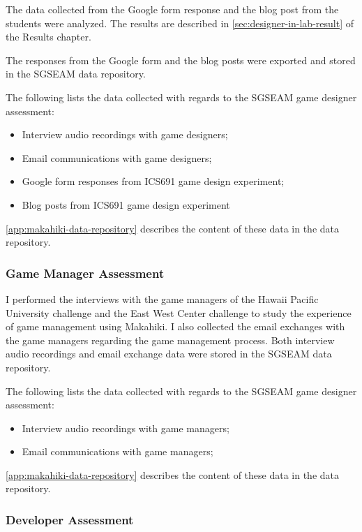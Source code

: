 The data collected from the Google form response and the blog post from the students were analyzed. The results are described in \autoref{sec:designer-in-lab-result} of the Results chapter.

The responses from the Google form and the blog posts were exported and stored in the SGSEAM data repository.

The following lists the data collected with regards to the SGSEAM game designer assessment:

\begin{itemize}
\item Interview audio recordings with game designers;
\item Email communications with game designers;
\item Google form responses from ICS691 game design experiment; 
\item Blog posts from ICS691 game design experiment
\end{itemize}

\autoref{app:makahiki-data-repository} describes the content of these data in the data repository.

\subsubsection{Game Manager Assessment}

I performed the interviews with the game managers of the Hawaii Pacific University challenge and the East West Center challenge to study the experience of game management using Makahiki. I also collected the email exchanges with the game managers regarding the game management process. Both interview audio recordings and email exchange data were stored in the SGSEAM data repository.

The following lists the data collected with regards to the SGSEAM game designer assessment:

\begin{itemize}
\item Interview audio recordings with game managers;
\item Email communications with game managers;
\end{itemize}

\autoref{app:makahiki-data-repository} describes the content of these data in the data repository.

\subsubsection{Developer Assessment}

